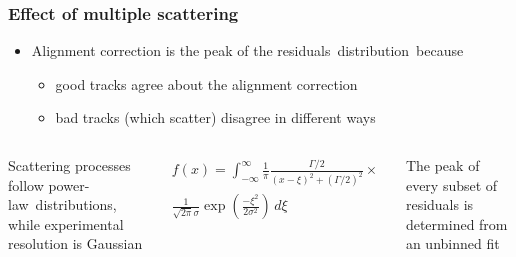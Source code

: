 \documentclass[compress]{beamer}
\begin{document}
\begin{frame}
\frametitle{Effect of multiple scattering}

\begin{itemize}
\item Alignment correction is the peak of the \mbox{residuals distribution because\hspace{-1 cm}}
\begin{itemize}
\item good tracks agree about the alignment correction
\item bad tracks (which scatter) disagree in different ways
\end{itemize}
\end{itemize}

\begin{columns}
Scattering processes follow \mbox{power-law distributions,\hspace{-1 cm}} while
  experimental resolution is Gaussian

\vspace{-0.5 cm}
\begin{multline*}
f(x) = \int_{-\infty}^\infty \frac{1}{\pi}\frac{\Gamma/2}{(x - \xi)^2 + (\Gamma/2)^2} \times \\
\frac{1}{\sqrt{2\pi} \sigma} \exp\left(\frac{-\xi^2}{2 \sigma^2}\right) \, d\xi
\end{multline*}

The peak of every subset of residuals is determined from an unbinned fit


\end{columns}
\end{frame}
\end{document}
